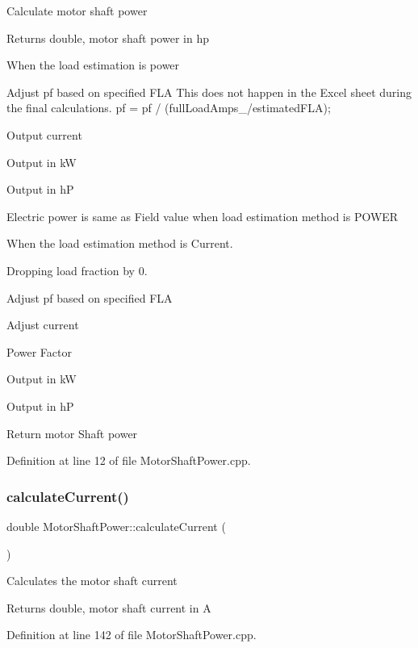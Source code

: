 Calculate motor shaft power

\begin{DoxyReturn}{Returns}
double, motor shaft power in hp 
\end{DoxyReturn}
When the load estimation is power

Adjust pf based on specified F\+LA This does not happen in the Excel sheet during the final calculations. pf = pf / (full\+Load\+Amps\+\_\+/estimated\+F\+LA);

Output current

Output in kW

Output in hP

Electric power is same as Field value when load estimation method is P\+O\+W\+ER

When the load estimation method is Current.

Dropping load fraction by 0.

Adjust pf based on specified F\+LA

Adjust current

Power Factor

Output in kW

Output in hP

Return motor Shaft power 

Definition at line 12 of file Motor\+Shaft\+Power.\+cpp.

\mbox{\label{class_motor_shaft_power_a3ce530d426fa14223199d89f54f34244}} 
\subsubsection{\texorpdfstring{calculate\+Current()}{calculateCurrent()}}
{\footnotesize\ttfamily double Motor\+Shaft\+Power\+::calculate\+Current (\begin{DoxyParamCaption}{ }\end{DoxyParamCaption})}

Calculates the motor shaft current

\begin{DoxyReturn}{Returns}
double, motor shaft current in A 
\end{DoxyReturn}


Definition at line 142 of file Motor\+Shaft\+Power.\+cpp.

\mbox{\label{class_motor_shaft_power_ab7df0b41dc9d1bc6a591f0ab8f57b7ee}} 

